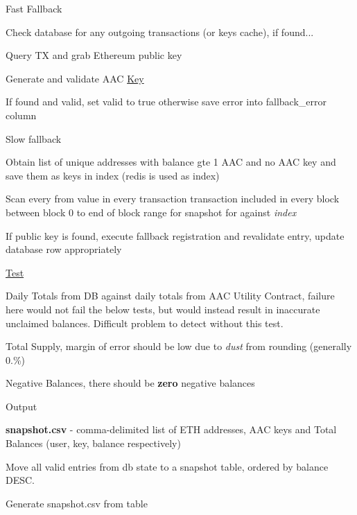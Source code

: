 \begin{DoxyEnumerate}
\begin{DoxyEnumerate}
\begin{DoxyEnumerate}
\item Fast Fallback
\begin{DoxyEnumerate}
\item Check database for any outgoing transactions (or keys cache), if found...
\begin{DoxyEnumerate}
\item Query TX and grab Ethereum public key
\item Generate and validate A\+AC \mbox{\hyperlink{struct_key}{Key}}
\item If found and valid, set {\ttfamily valid} to {\ttfamily true} otherwise save error into {\ttfamily fallback\+\_\+error} column
\end{DoxyEnumerate}
\end{DoxyEnumerate}
\end{DoxyEnumerate}
\end{DoxyEnumerate}
\end{DoxyEnumerate}

Slow fallback
\begin{DoxyEnumerate}
\item Obtain list of unique addresses with balance gte 1 A\+AC and no A\+AC key and save them as keys in index (redis is used as index)
\item Scan every {\ttfamily from} value in every transaction transaction included in every block between block 0 to end of block range for snapshot for against {\itshape index}
\item If public key is found, execute fallback registration and revalidate entry, update database row appropriately
\end{DoxyEnumerate}

\mbox{\hyperlink{struct_test}{Test}}
\begin{DoxyEnumerate}
\item Daily Totals from DB against daily totals from A\+AC Utility Contract, failure here would not fail the below tests, but would instead result in inaccurate unclaimed balances. Difficult problem to detect without this test.
\item Total Supply, margin of error should be low due to {\itshape dust} from rounding (generally 0.\%)
\item Negative Balances, there should be {\bfseries zero} negative balances
\end{DoxyEnumerate}

Output
\begin{DoxyEnumerate}
\item {\bfseries snapshot.\+csv} -\/ comma-\/delimited list of E\+TH addresses, A\+AC keys and Total Balances (user, key, balance respectively)
\begin{DoxyEnumerate}
\item Move all valid entries from db state to a snapshot table, ordered by balance D\+E\+SC.
\item Generate snapshot.\+csv from table
\end{DoxyEnumerate}
\end{DoxyEnumerate}


